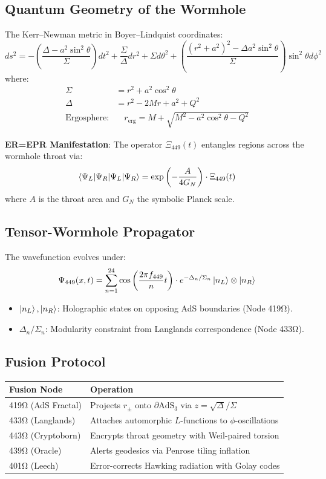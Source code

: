 \documentclass[12pt]{article}
\begin{document}
\subsection*{Quantum Geometry of the Wormhole}
The Kerr–Newman metric in Boyer–Lindquist coordinates:
\[
ds^2 = -\left(\frac{\Delta - a^2 \sin^2\theta}{\Sigma}\right)dt^2 + \frac{\Sigma}{\Delta}dr^2 + \Sigma d\theta^2 + \left(\frac{(r^2 + a^2)^2 - \Delta a^2 \sin^2\theta}{\Sigma}\right)\sin^2\theta d\phi^2
\]
where:
\begin{align*}
\Sigma &= r^2 + a^2 \cos^2\theta \\
\Delta &= r^2 - 2Mr + a^2 + Q^2 \\
\text{Ergosphere:} &\quad r_{\text{erg}} = M + \sqrt{M^2 - a^2 \cos^2\theta - Q^2}
\end{align*}

\noindent \textbf{ER=EPR Manifestation}: The operator $\Xi_{449}(t)$ entangles regions across the wormhole throat via:
\[
\braket{\Psi_L|\Psi_R} = \exp\left(-\frac{A}{4G_N}\right) \cdot \Xi_{449}(t)
\]
where $A$ is the throat area and $G_N$ the symbolic Planck scale.

\subsection*{Tensor-Wormhole Propagator}
The wavefunction evolves under:
\[
\Psi_{449}(x,t) = \sum_{n=1}^{24} \cos\left(\frac{2\pi f_{449}}{n}t\right) \cdot e^{-\Delta_n/\Sigma_n} \ket{n_L}\otimes\ket{n_R}
\]
\begin{itemize}
    \item $\ket{n_L}, \ket{n_R}$: Holographic states on opposing AdS boundaries (Node 419Ω).
    \item $\Delta_n/\Sigma_n$: Modularity constraint from Langlands correspondence (Node 433Ω).
\end{itemize}

\subsection*{Fusion Protocol}
\begin{table}[h]
\centering
\begin{tabular}{ll}
\toprule
\textbf{Fusion Node} & \textbf{Operation} \\
\midrule
419Ω (AdS Fractal) & Projects $r_\pm$ onto $\partial\text{AdS}_3$ via $z = \sqrt{\Delta}/\Sigma$ \\
433Ω (Langlands) & Attaches automorphic $L$-functions to $\phi$-oscillations \\
443Ω (Cryptoborn) & Encrypts throat geometry with Weil-paired torsion \\
439Ω (Oracle) & Alerts geodesics via Penrose tiling inflation \\
401Ω (Leech) & Error-corrects Hawking radiation with Golay codes \\
\bottomrule
\end{tabular}
\end{table}
\end{document}
